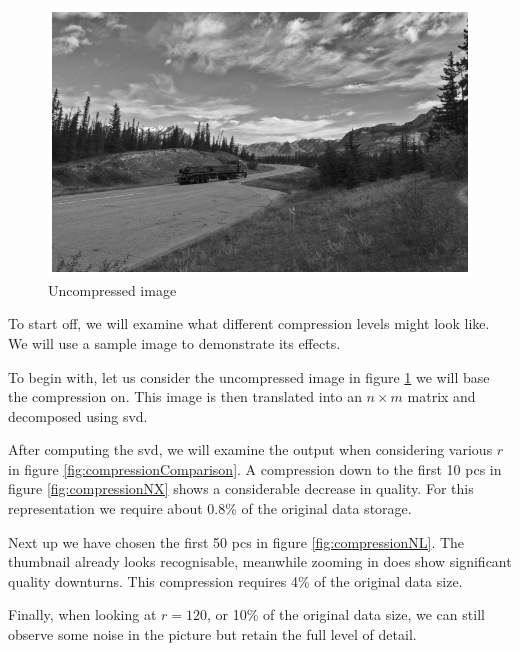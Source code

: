 \begin{figure}
    \centering
    \includegraphics[width=0.9\linewidth]{external_content/media/compression_example/uncompressed.png}
    \captionsetup{justification=centering}
    \caption{Uncompressed image}
    \label{fig:uncompressed}
\end{figure}

To start off, we will examine what different compression levels might look like.
We will use a sample image to demonstrate its effects.

To begin with, let us consider the uncompressed image in figure \ref{fig:uncompressed} we will base the compression on.
This image is then translated into an $n \times m$ matrix and decomposed using \gls{svd}.

After computing the \gls{svd}, we will examine the output when considering various $r$  in figure \ref{fig:compressionComparison}.
A compression down to the first 10 \glspl{pc} in figure \ref{fig:compressionNX} shows a considerable decrease in quality.
For this representation we require about 0.8\% of the original data storage.

Next up we have chosen the first 50 \glspl{pc} in figure \ref{fig:compressionNL}.
The thumbnail already looks recognisable, meanwhile zooming in does show significant quality downturns.
This compression requires 4\% of the original data size.

Finally, when looking at $r=120$, or 10\% of the original data size, we can still observe some noise in the picture but retain the full level of detail.



